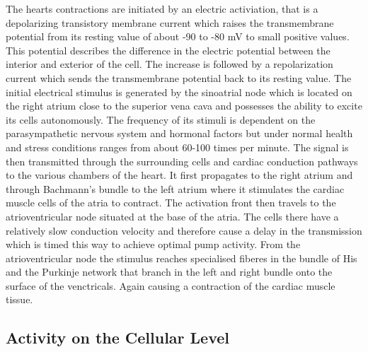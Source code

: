 \documentclass[fleqn, a4paper, 11pt, bibliography=totoc]{report}
\begin{document}
The hearts contractions are initiated by an electric activiation, that is a depolarizing transistory membrane current which raises the transmembrane potential from its resting value of about -90 to -80 mV to small positive values. This potential describes the difference in the electric potential between the interior and exterior of the cell. The increase is followed by a repolarization current which sends the transmembrane potential back to its resting value. The initial electrical stimulus is generated by the sinoatrial node which is located on the right atrium close to the superior vena cava and possesses the ability to excite its cells autonomously. The frequency of its stimuli is dependent on the parasympathetic nervous system and hormonal factors but under normal health and stress conditions ranges from about 60-100 times per minute. The signal is then transmitted through the surrounding cells and cardiac conduction pathways to the various chambers of the heart. It first propagates to the right atrium and through Bachmann's bundle to the left atrium where it stimulates the cardiac muscle cells of the atria to contract. The activation front then travels to the atrioventricular node situated at the base of the atria. The cells there have a relatively slow conduction velocity and therefore cause a delay in the transmission which is timed this way to achieve optimal pump activity. From the atrioventricular node the stimulus reaches specialised fiberes in the bundle of His and the Purkinje network that branch in the left and right bundle onto the surface of the venctricals. Again causing a contraction of the cardiac muscle tissue. 

\subsection{Activity on the Cellular Level}
\end{document}
